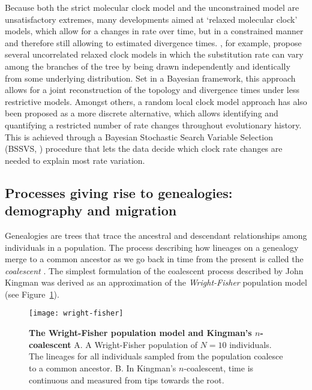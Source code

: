 Because both the strict molecular clock model and the unconstrained model are unsatisfactory extremes, many developments aimed at `relaxed molecular clock' models, which allow for a changes in rate over time, but in a constrained manner and therefore still allowing to estimated divergence times.
\citet{Drummond2006}, for example, propose several uncorrelated relaxed clock models in which the substitution rate can vary among the branches of the tree by being drawn independently and identically from some underlying distribution.
Set in a Bayesian framework, this approach allows for a joint reconstruction of the topology and divergence times under less restrictive models.
Amongst others, a random local clock model approach has also been proposed \citet{Drummond2010} as a more discrete alternative, which allows identifying and quantifying a restricted number of rate changes throughout evolutionary history.
This is achieved through a Bayesian Stochastic Search Variable Selection (BSSVS, \citet{Lemey2009}) procedure that lets the data decide which clock rate changes are needed to explain most rate variation.

\subsection{Processes giving rise to genealogies: demography and migration\label{sub:molecular_clock}}

Genealogies are trees that trace the ancestral and descendant relationships among individuals in a population.
The process describing how lineages on a genealogy merge to a common ancestor as we go back in time from the present is called the \textit{coalescent} \citep{Kingman1982}.
The simplest formulation of the coalescent process described by John Kingman was derived as an approximation of the \textit{Wright-Fisher} \citep{Fisher1930,Wright1931} population model (see Figure~\ref{fig:wright-fisher}).

\begin{figure}[h!]
\centering
\texttt{[image: wright-fisher]} 
\caption{
{ \footnotesize 
{\bf The Wright-Fisher population model and Kingman's $n$-coalescent} A. A Wright-Fisher population of $N=10$ individuals. The lineages for all individuals sampled from the population coalesce to a common ancestor.
B.  In Kingman's $n$-coalescent, time is continuous and measured from tips towards the root.
}%
}
\label{fig:wright-fisher}
\end{figure}

